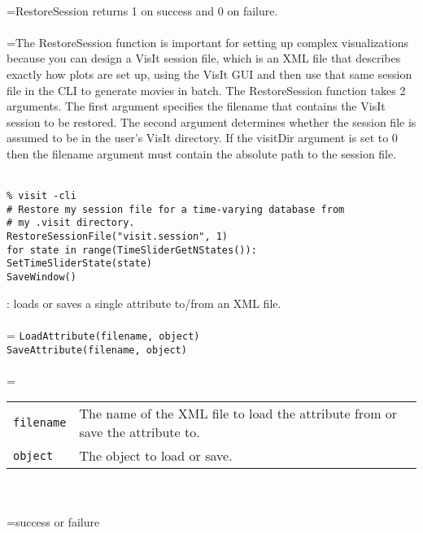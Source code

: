 \documentclass[10pt,a4paper]{report}
\begin{document}
 \\ 
\hangindent=\parindent RestoreSession returns 1 on success and 0 on failure. \\[-3mm] 

 \\ 
\hangindent=\parindent The RestoreSession function is important for setting up complex visualizations because you can design a VisIt session file, which is an XML file that describes exactly how plots are set up, using the VisIt GUI and then use that same session file in the CLI to generate movies in batch. The RestoreSession function takes 2 arguments. The first argument specifies the filename that contains the VisIt session to be restored. The second argument determines whether the session file is assumed to be in the user's VisIt directory. If the visitDir argument is set to 0 then the filename argument must contain the absolute path to the session file. \\[-3mm] 

\\[-6mm]
\begin{verbatim}% visit -cli
# Restore my session file for a time-varying database from 
# my .visit directory.
RestoreSessionFile("visit.session", 1)
for state in range(TimeSliderGetNStates()):
SetTimeSliderState(state)
SaveWindow()
\end{verbatim}
\newpage


{}
: loads or saves a single attribute to/from an XML file.\\[-3mm]

 \\ 
\hangindent=\parindent 
\verb!LoadAttribute(filename, object)!\\ 
\verb!SaveAttribute(filename, object)!\\ [-3mm]

 \\ 
\hangindent=\parindent 
\begin{tabular}{lp{9cm}}
\verb!filename! & The name of the XML file to load the attribute from or save the attribute to. \\
\verb!object! & The object to load or save. \\
\end{tabular} \\[-2mm]


 \\ 
\hangindent=\parindent success or failure \\[-3mm] 
\end{document}
